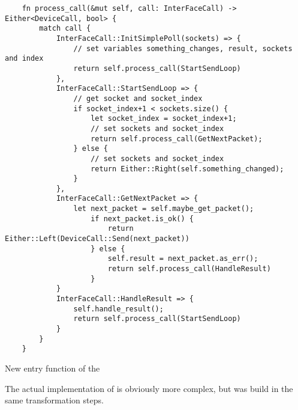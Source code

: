 \begin{codefigure}
    \begin{verbatim}
    fn process_call(&mut self, call: InterFaceCall) -> Either<DeviceCall, bool> {
        match call {
            InterFaceCall::InitSimplePoll(sockets) => {
                // set variables something_changes, result, sockets and index
                return self.process_call(StartSendLoop)
            },
            InterFaceCall::StartSendLoop => {
                // get socket and socket_index
                if socket_index+1 < sockets.size() {
                    let socket_index = socket_index+1;
                    // set sockets and socket_index
                    return self.process_call(GetNextPacket);
                } else {
                    // set sockets and socket_index
                    return Either::Right(self.something_changed);
                }
            },
            InterFaceCall::GetNextPacket => {
                let next_packet = self.maybe_get_packet();
                    if next_packet.is_ok() {
                        return Either::Left(DeviceCall::Send(next_packet))
                    } else {
                        self.result = next_packet.as_err();
                        return self.process_call(HandleResult)
                    }
            }
            InterFaceCall::HandleResult => {
                self.handle_result();
                return self.process_call(StartSendLoop)
            }
        }
    }
\end{verbatim}
\caption{New entry function of the \stack{}}
\label{fig:processIPStack}
\end{codefigure}


The actual implementation of  is obviously more complex, but was build in the same transformation steps. 

